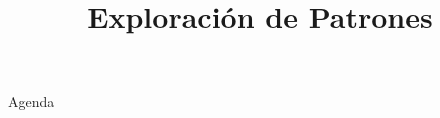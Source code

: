 \documentclass[../main.tex]{subfiles}
\title{Exploración de Patrones}
\begin{document}
\begin{frame}
  \maketitle
\end{frame}


     \begin{frame}{Agenda}
   \tableofcontents
 \end{frame}





\begin{frame}
  \maketitle
\end{frame}
\end{document}
